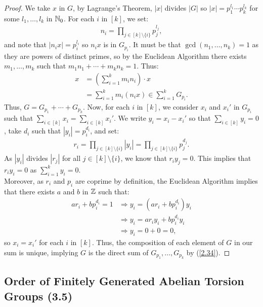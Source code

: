 \begin{proof}
    We take $x$ in $G$, by Lagrange's Theorem, $|x|$ divides $|G|$ so
    $|x| = p_1^{l_1} \cdots p_k^{l_k}$ for some $l_1, \ldots, l_k$ in $\mathbb{N}_0$.
    For each $i$ in $[k]$, we set: \begin{align*}
        n_i = \prod_{j \in [k]\setminus\{i\}} p_j^{l_j},
    \end{align*} and note that $|n_ix| = p_i^{l_i}$ so $n_ix$ is in $G_{p_i}$.
    It must be that $\gcd(n_1, \ldots, n_k) = 1$ as they are powers of distinct
    primes, so by the Euclidean Algorithm there exists $m_1, \ldots, m_k$ such that 
    $m_1n_1 + \cdots + m_kn_k = 1$. Thus:
    \begin{align*}
        x 
        &= \left(\sum_{i = 1}^k m_in_i\right) \cdot x \\
        &= \sum_{i = 1}^k m_i(n_ix) \in \sum_{i = 1}^k G_{p_i}. 
    \end{align*} Thus, $G = G_{p_1} + \cdots + G_{p_k}$.
    Now, for each $i$ in $[k]$, we consider $x_i$ and $x_i'$ in $G_{p_i}$ such
    that $\sum_{i \in [k]} x_i = \sum_{i \in [k]} x_i'$. We write
    $y_i = x_i - x_i'$ so that $\sum_{i \in [k]} y_i = 0$,
    take $d_i$ such that $|y_i| = p_i^{d_i}$, and set: \begin{align*}
        r_i 
        = \prod_{j \in [k] \setminus \{i\}} |y_i|
        = \prod_{j \in [k] \setminus \{i\}} p_j^{d_j}.
    \end{align*} As $|y_i|$ divides $|r_j|$ for all 
    $j \in [k] \setminus \{i\}$, we know that $r_iy_j = 0$.
    This implies that $r_iy_i = 0$ as $\sum_{i = 1}^k y_i = 0$.
    \\[\baselineskip]
    Moreover, as $r_i$ and $p_i$ are coprime by definition, the
    Euclidean Algorithm implies that there exists $a$ and $b$ in $\mathbb{Z}$
    such that: \begin{align*}
        ar_i + bp_i^{d_i} = 1
        & \Longrightarrow y_i = (ar_i + bp_i^{d_i})y_i  \\
        & \Longrightarrow y_i = ar_iy_i + bp_i^{d_i}y_i  \\
        & \Longrightarrow y_i = 0 + 0 = 0, 
    \end{align*} so $x_i = x_i'$ for each $i$ in $[k]$. Thus, the
    composition of each element of $G$ in our sum is unique, implying 
    $G$ is the direct sum of $G_{p_1}, \ldots, G_{p_k}$ by (\ref{2.34}).
\end{proof}

\subsection{Order of Finitely Generated Abelian Torsion Groups (3.5)} \label{3.5}


